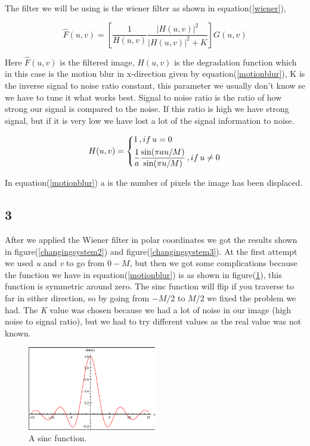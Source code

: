 {The filter we will be using is the wiener filter as shown in equation(\ref{wiener}),

\begin{equation}
    \hat{F}(u,v) = \left[\frac{1}{H(u,v)}\frac{|H(u,v)|^{2}}{|H(u,v)|^{2} + K}\right]G(u,v)
    \label{wiener}
\end{equation}

Here $\hat{F}(u,v)$ is the filtered image, $H(u,v)$ is the degradation function which in this case is the motion blur in x-direction given by equation(\ref{motionblur}), K is the inverse signal to noise ratio constant, this parameter we usually don't know se we have to tune it what works best. Signal to noise ratio is the ratio of how strong our signal is compared to the noise. If this ratio is high we have strong signal, but if it is very low we have lost a lot of the signal information to noise.

\begin{equation}
    H(u,v) =     \begin{dcases}
        1\, , if \,u = 0\\
        \frac{1}{a}\frac{\sin(\pi a u/M)}{\sin(\pi u /M)}\, , if \, u \neq 0\\
    \end{dcases}
    \label{motionblur}
\end{equation}

In equation(\ref{motionblur}) a is the number of pixels the image has been displaced. 


\subsection{3}


After we applied the Wiener filter in polar coordinates we got the results shown in figure(\ref{changingsystem2}) and figure(\ref{changingsystem3}). At the first attempt we used \emph{u} and \emph{v} to go from $0-M$, but then we got some complications because the function we have in equation(\ref{motionblur}) is as shown in figure(\ref{sincc}), this function is symmetric around zero. The sinc function will flip if you traverse to far in either direction, so by going from $-M/2$ to $M/2$ we fixed the problem we had. The \emph{K} value was chosen because we had a lot of noise in our image (high noise to signal ratio), but we had to try different values as the real value was not known.


\begin{figure}[H]
    {\centering
        \includegraphics[width=0.5\textwidth]{sinc.png}
        \caption{A sinc function.}
        \label{sincc}
    \par}
    \end{figure}

}
